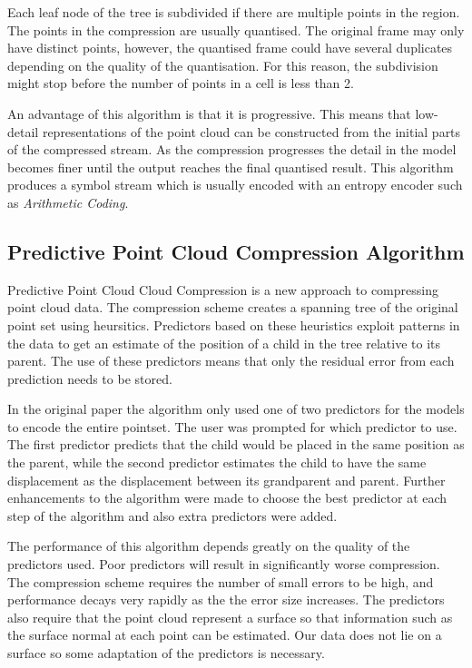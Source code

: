 \documentclass[a4paper,11pt]{report}
\begin{document}
Each leaf node of the tree is subdivided if there are multiple points in the region. The points in the compression are usually quantised. The original frame may only have distinct points, however, the quantised frame could have several duplicates depending on the quality of the quantisation. For this reason, the subdivision might stop before the number of points in a cell is less than 2.

An advantage of this algorithm is that it is progressive. This means that low-detail representations of the point cloud can be constructed from the initial parts of the compressed stream. As the compression progresses the detail in the model becomes finer until the output reaches the final quantised result. This algorithm produces a symbol stream which is usually encoded with an entropy encoder such as \emph{Arithmetic Coding}\cite{RefWorks:4}.

\subsection{Predictive Point Cloud Compression Algorithm}

Predictive Point Cloud Cloud Compression is a new approach to compressing point cloud data. The compression scheme creates a spanning tree of the original point set using heursitics.\cite{gumholdcomp} Predictors based on these heuristics exploit patterns in the data to get an estimate of the position of a child in the tree relative to its parent. The use of these predictors means that only the residual error from each prediction needs to be stored.

In the original paper the algorithm only used one of two predictors for the models to encode the entire pointset. The user was prompted for which predictor to use. The first predictor predicts that the child would be placed in the same position as the parent, while the second predictor estimates the child to have the same displacement as the displacement between its grandparent and parent. Further enhancements to the algorithm were made to choose the best predictor at each step of the algorithm and also extra predictors were added.\cite{merrycomp}

The performance of this algorithm depends greatly on the quality of the predictors used. Poor predictors will result in significantly worse compression. The compression scheme requires the number of small errors to be high, and performance decays very rapidly as the the error size increases. The predictors also require that the point cloud represent a surface so that information such as the surface normal at each point can be estimated. Our data does not lie on a surface so some adaptation of the predictors is necessary.
\end{document}
